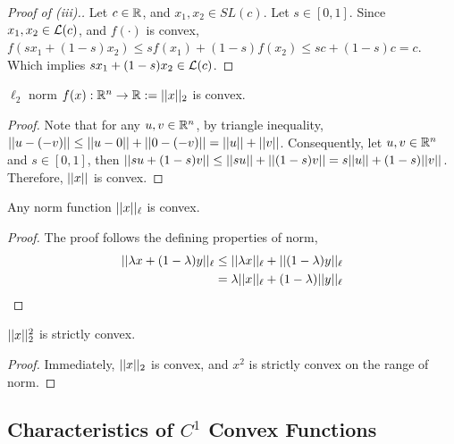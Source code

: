 \documentclass{article}
\begin{document}
    \begin{proof}[Proof of (iii).]
    	Let $c \in \mathbb{R}$, and $x_1 ,x_2 \in SL(c)$. Let $s \in [0, 1]$. Since $x_1, x_2 \in \mathcal{{L}}(c)$, and $f(\cdot)$ is convex, $f(s x_1 + (1-s) x_2) \leq s f(x_1) + (1-s) f(x_2) \leq s c + (1-s) c = c$. Which implies $s x_1 + (1-s) x_2 \in \mathcal{{L}}(c)$.
    \end{proof}
    
    \begin{example}
    	$\ell_2$ norm $f(x): \mathbb{R}^n \to \mathbb{R} := \vert \vert {x} \vert \vert_2$ is convex.
    \end{example}
    
    \begin{proof}
    	Note that for any $u, v \in \mathbb{R}^n$, by triangle inequality, $\vert \vert {u - (-v)} \vert \vert \leq \vert \vert {u - 0} \vert \vert + \vert \vert {0 - (-v)} \vert \vert = \vert \vert {u} \vert \vert + \vert \vert {v} \vert \vert$. Consequently, let $u, v \in \mathbb{R}^n$ and $s \in [0, 1]$, then $\vert \vert {s u + (1-s) v} \vert \vert \leq \vert \vert {su} \vert \vert + \vert \vert {(1-s) v} \vert \vert = s \vert \vert {u} \vert \vert + (1-s) \vert \vert {v} \vert \vert$. Therefore, $\vert \vert {x} \vert \vert$ is convex.
    \end{proof}
    
    \begin{proposition}
    	Any norm function $\vert \vert {x} \vert \vert_\ell$ is convex.
    \end{proposition}
    
    \begin{proof}
    	The proof follows the defining properties of norm,
    	\begin{align}
    		\vert \vert {\lambda x + (1 - \lambda) y} \vert \vert_\ell &\leq \vert \vert {\lambda x} \vert \vert_\ell  + \vert \vert {(1 - \lambda) y} \vert \vert_\ell \\
    		&= \lambda \vert \vert {x} \vert \vert_\ell + (1 - \lambda) \vert \vert {y} \vert \vert_\ell
    	\end{align}
    \end{proof}
    
    \begin{proposition}
    	$\vert \vert {x} \vert \vert_2^2$ is strictly convex.
    \end{proposition}
    
    \begin{proof}
    	Immediately, $\vert \vert {x} \vert \vert_2$ is convex, and $x^2$ is strictly convex on the range of norm.
    \end{proof}
	
	\subsection{Characteristics of $C^1$ Convex Functions}
	
\end{document}

